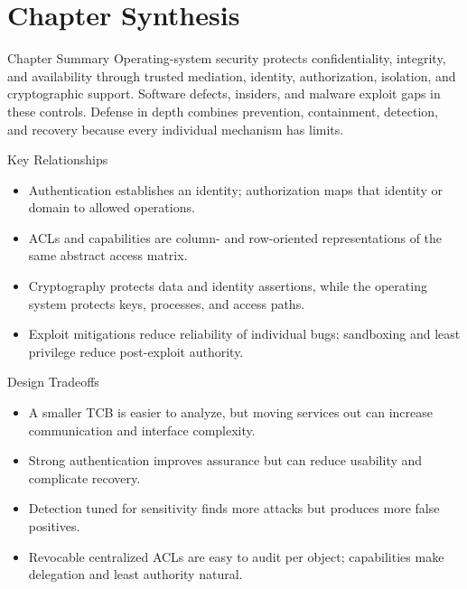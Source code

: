 \documentclass[10pt,letterpaper]{article}
\begin{document}
\section*{Chapter Synthesis}
\begin{studybox}{Chapter Summary}
Operating-system security protects confidentiality, integrity, and availability through trusted mediation, identity, authorization, isolation, and cryptographic support. Software defects, insiders, and malware exploit gaps in these controls. Defense in depth combines prevention, containment, detection, and recovery because every individual mechanism has limits.
\end{studybox}

\begin{studybox}{Key Relationships}
\begin{itemize}
  \item Authentication establishes an identity; authorization maps that identity or domain to allowed operations.
  \item ACLs and capabilities are column- and row-oriented representations of the same abstract access matrix.
  \item Cryptography protects data and identity assertions, while the operating system protects keys, processes, and access paths.
  \item Exploit mitigations reduce reliability of individual bugs; sandboxing and least privilege reduce post-exploit authority.
\end{itemize}
\end{studybox}

\begin{studybox}{Design Tradeoffs}
\begin{itemize}
  \item A smaller TCB is easier to analyze, but moving services out can increase communication and interface complexity.
  \item Strong authentication improves assurance but can reduce usability and complicate recovery.
  \item Detection tuned for sensitivity finds more attacks but produces more false positives.
  \item Revocable centralized ACLs are easy to audit per object; capabilities make delegation and least authority natural.
\end{itemize}
\end{studybox}
\end{document}
